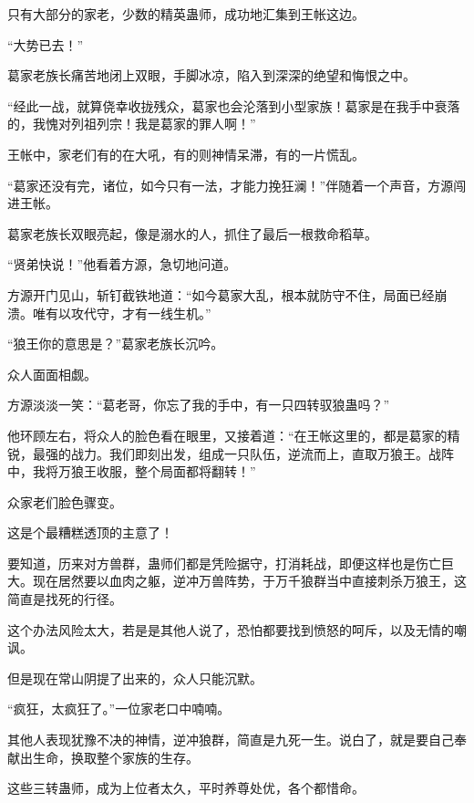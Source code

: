 \begin{this_body}
只有大部分的家老，少数的精英蛊师，成功地汇集到王帐这边。

“大势已去！”

葛家老族长痛苦地闭上双眼，手脚冰凉，陷入到深深的绝望和悔恨之中。

“经此一战，就算侥幸收拢残众，葛家也会沦落到小型家族！葛家是在我手中衰落的，我愧对列祖列宗！我是葛家的罪人啊！”

王帐中，家老们有的在大吼，有的则神情呆滞，有的一片慌乱。

“葛家还没有完，诸位，如今只有一法，才能力挽狂澜！”伴随着一个声音，方源闯进王帐。

葛家老族长双眼亮起，像是溺水的人，抓住了最后一根救命稻草。

“贤弟快说！”他看着方源，急切地问道。

方源开门见山，斩钉截铁地道：“如今葛家大乱，根本就防守不住，局面已经崩溃。唯有以攻代守，才有一线生机。”

“狼王你的意思是？”葛家老族长沉吟。

众人面面相觑。

方源淡淡一笑：“葛老哥，你忘了我的手中，有一只四转驭狼蛊吗？”

他环顾左右，将众人的脸色看在眼里，又接着道：“在王帐这里的，都是葛家的精锐，最强的战力。我们即刻出发，组成一只队伍，逆流而上，直取万狼王。战阵中，我将万狼王收服，整个局面都将翻转！”

众家老们脸色骤变。

这是个最糟糕透顶的主意了！

要知道，历来对方兽群，蛊师们都是凭险据守，打消耗战，即便这样也是伤亡巨大。现在居然要以血肉之躯，逆冲万兽阵势，于万千狼群当中直接刺杀万狼王，这简直是找死的行径。

这个办法风险太大，若是是其他人说了，恐怕都要找到愤怒的呵斥，以及无情的嘲讽。

但是现在常山阴提了出来的，众人只能沉默。

“疯狂，太疯狂了。”一位家老口中喃喃。

其他人表现犹豫不决的神情，逆冲狼群，简直是九死一生。说白了，就是要自己奉献出生命，换取整个家族的生存。

这些三转蛊师，成为上位者太久，平时养尊处优，各个都惜命。

\end{this_body}

